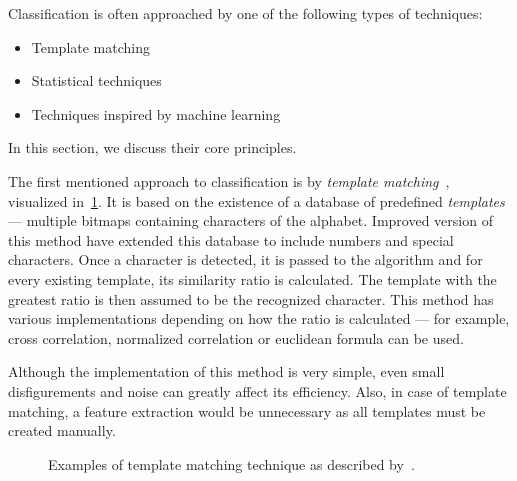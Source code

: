 Classification is often approached by one of the following types of techniques:
\begin{itemize}
    \item Template matching
    \item Statistical techniques
    \item Techniques inspired by machine learning
\end{itemize}

In this section, we discuss their core principles.

The first mentioned approach to classification is by \emph{template matching}~\citep{templateMatching}, visualized in~\cref{fig:characterClassTemplate}. It is based on the existence of a database of predefined \emph{templates} --- multiple bitmaps containing characters of the alphabet. Improved version of this method have extended this database to include numbers and special characters. Once a character is detected, it is passed to the algorithm and for every existing template, its similarity ratio is calculated. The template with the greatest ratio is then assumed to be the recognized character. This method has various implementations depending on how the ratio is calculated --- for example, cross correlation, normalized correlation or euclidean formula can be used.

Although the implementation of this method is very simple, even small disfigurements and noise can greatly affect its efficiency. Also, in case of template matching, a feature extraction would be unnecessary as all templates must be created manually.

\begin{figure}[t]
    \noindent
	\caption{Examples of template matching technique as described by~\citet{Ning1993AnIO}.}
	\label{fig:characterClassTemplate}
\end{figure}

